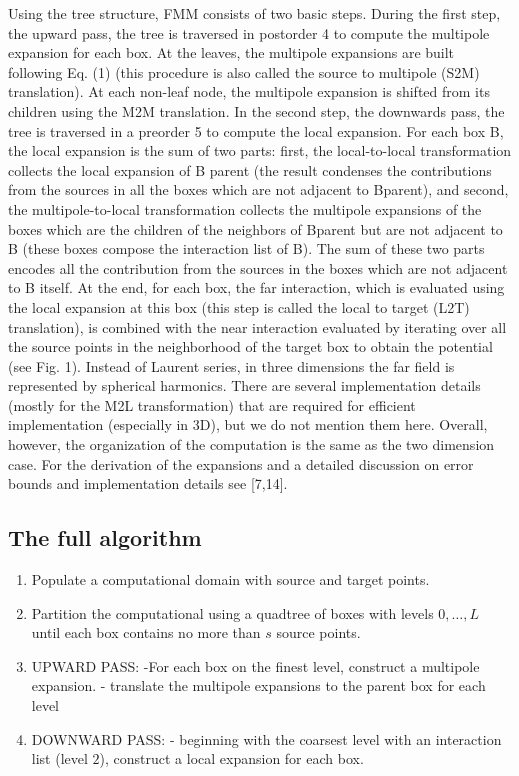 \documentclass[11pt, oneside]{article}   	%
\begin{document}
Using the tree structure, FMM consists of two basic steps. During the first step, the upward pass, the tree
is traversed in postorder 4 to compute the multipole expansion for each box. At the leaves, the multipole
expansions are built following Eq. (1) (this procedure is also called the source to multipole (S2M) translation).
At each non-leaf node, the multipole expansion is shifted from its children using the M2M
translation. In the second step, the downwards pass, the tree is traversed in a preorder 5 to compute the local
expansion. For each box B, the local expansion is the sum of two parts: first, the local-to-local transformation
collects the local expansion of B parent (the result condenses the contributions from the sources in
all the boxes which are not adjacent to Bparent), and second, the multipole-to-local transformation
collects the multipole expansions of the boxes which are the children of the neighbors of Bparent but are
not adjacent to B (these boxes compose the interaction list of B). The sum of these two parts encodes all the
contribution from the sources in the boxes which are not adjacent to B itself. At the end, for each box, the
far interaction, which is evaluated using the local expansion at this box (this step is called the local to target
(L2T) translation), is combined with the near interaction evaluated by iterating over all the source points in
the neighborhood of the target box to obtain the potential (see Fig. 1).
Instead of Laurent series, in three dimensions the far field is represented by spherical harmonics. There
are several implementation details (mostly for the M2L transformation) that are required for efficient
implementation (especially in 3D), but we do not mention them here. Overall, however, the organization of
the computation is the same as the two dimension case. For the derivation of the expansions and a detailed
discussion on error bounds and implementation details see [7,14].

\subsection{The full algorithm}
\begin{enumerate}
\item Populate a computational domain with source and target points.
\item Partition the computational using a quadtree of boxes with levels $0,\dots,L$ until each box contains no more than $s$ source points.
\item UPWARD PASS: -For each box on the finest level, construct a multipole expansion. - translate the multipole expansions to the parent box for each level
\item DOWNWARD PASS: - beginning with the coarsest level with an interaction list (level $2$), construct a local expansion for each box.
\end{enumerate}
\end{document}
